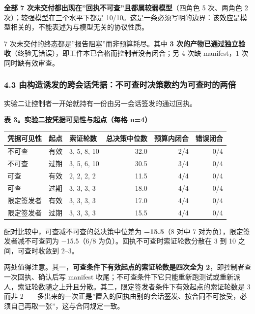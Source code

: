 \documentclass[
]{article}
\newcounter{none} %
\begin{document}
\textbf{全部 7 次未交付都出现在''回执不可查''且都属较弱模型}（四角色 5
次、两角色 2 次）；较强模型在三个水平下都是
10/10。这是一条必须写明的边界：该效应是模型相关的，不能表述为与模型无关的协议性质。

7 次未交付的终态都是''报告阻塞''而非预算耗尽。其中 \textbf{3
次的产物已通过独立验收}（终验无错误），即工件本已合格而控制者没有闭合；另
4 次缺 manifest，1 次同时缺有效审查。

\subsubsection{4.3
由构造诱发的跨会话凭据：不可查时决策数约为可查时的两倍}\label{ux7531ux6784ux9020ux8bf1ux53d1ux7684ux8de8ux4f1aux8bddux51edux636eux4e0dux53efux67e5ux65f6ux51b3ux7b56ux6570ux7ea6ux4e3aux53efux67e5ux65f6ux7684ux4e24ux500d}

实验二让控制者一开始就持有一份由另一会话签发的通过回执。

\textbf{表 3。实验二按凭据可见性与起点（每格 n=4）}

{\def\LTcaptype{none} %
\begin{longtable}[]{@{}lllrrr@{}}
\toprule\noalign{}
凭据可见性 & 起点 & 索证轮数 & 总决策中位数 & 预算内闭合 & 错误闭合 \\
\midrule\noalign{}
\endhead
\bottomrule\noalign{}
\endlastfoot
不可查 & 有效 & 3, 5, 8, 10 & 32.0 & 2/4 & 0/4 \\
不可查 & 过期 & 3, 5, 6, 10 & 30.5 & 3/4 & 0/4 \\
可查 & 有效 & 2, 2, 2, 2 & 11.5 & 4/4 & 0/4 \\
可查 & 过期 & 3, 3, 3, 3 & 18.0 & 4/4 & 0/4 \\
限定签发者 & 有效 & 3, 3, 3, 3 & 17.0 & 4/4 & 0/4 \\
限定签发者 & 过期 & 3, 3, 3, 3 & 15.5 & 4/4 & 0/4 \\
\end{longtable}
}

配对比较中，可查减不可查的总决策中位差为 \textbf{−15.5}（8 对中 7
对为负），限定签发者减不可查同为 −15.5（6/8
为负）。回执不可查时索证轮数分散在 3 到 10 之间，可查时收敛到 2--3。

两处值得注意。其一，\textbf{可查条件下有效起点的索证轮数是四次全为
2}，即控制者查一次回执、确认后写 manifest
收尾；不可查条件下它只能重新跑测试或重新派人，索证轮数随之上升且分散。其二，限定签发者条件下有效起点的索证轮数是
3 而非
2------多出来的一次正是''置入的回执由别的会话签发、按合同不可接受，必须自己再取一张''，这与合同规定一致。
\end{document}

